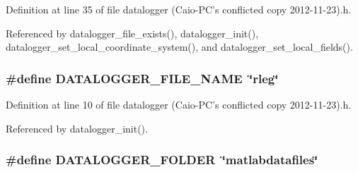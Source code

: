 Definition at line 35 of file datalogger (\-Caio-\/\-P\-C's conflicted copy 2012-\/11-\/23).\-h.



Referenced by datalogger\-\_\-file\-\_\-exists(), datalogger\-\_\-init(), datalogger\-\_\-set\-\_\-local\-\_\-coordinate\-\_\-system(), and datalogger\-\_\-set\-\_\-local\-\_\-fields().

\hypertarget{datalogger_01_07Caio-PC's_01conflicted_01copy_012012-11-23_08_8h_a23bf1fb88a2adab92e7c477d927b241c}{
\subsubsection[{D\-A\-T\-A\-L\-O\-G\-G\-E\-R\-\_\-\-F\-I\-L\-E\-\_\-\-N\-A\-M\-E}]{\setlength{\rightskip}{0pt plus 5cm}\#define D\-A\-T\-A\-L\-O\-G\-G\-E\-R\-\_\-\-F\-I\-L\-E\-\_\-\-N\-A\-M\-E~\char`\"{}rleg\char`\"{}}}\label{datalogger_01_07Caio-PC's_01conflicted_01copy_012012-11-23_08_8h_a23bf1fb88a2adab92e7c477d927b241c}


Definition at line 10 of file datalogger (\-Caio-\/\-P\-C's conflicted copy 2012-\/11-\/23).\-h.



Referenced by datalogger\-\_\-init().

\hypertarget{datalogger_01_07Caio-PC's_01conflicted_01copy_012012-11-23_08_8h_a29791c024463d251eeab6973a0299e7b}{
\subsubsection[{D\-A\-T\-A\-L\-O\-G\-G\-E\-R\-\_\-\-F\-O\-L\-D\-E\-R}]{\setlength{\rightskip}{0pt plus 5cm}\#define D\-A\-T\-A\-L\-O\-G\-G\-E\-R\-\_\-\-F\-O\-L\-D\-E\-R~\char`\"{}matlabdatafiles\char`\"{}}}\label{datalogger_01_07Caio-PC's_01conflicted_01copy_012012-11-23_08_8h_a29791c024463d251eeab6973a0299e7b}


